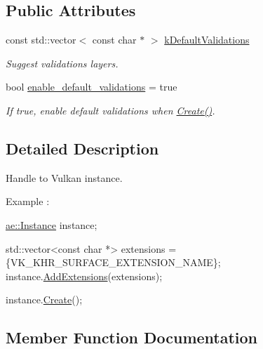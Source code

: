 \subsection*{Public Attributes}
\begin{DoxyCompactItemize}
\item 
const std\+::vector$<$ const char $\ast$ $>$ \hyperlink{classae_1_1_instance_a51fa0c0f46de73754c52841fc458d4ac}{k\+Default\+Validations}
\begin{DoxyCompactList}\small\item\em Suggest validations layers. \end{DoxyCompactList}\item 
\hypertarget{classae_1_1_instance_a5dabba3cfc37e4f41a5c8a0b710f2adf}{}\label{classae_1_1_instance_a5dabba3cfc37e4f41a5c8a0b710f2adf} 
bool \hyperlink{classae_1_1_instance_a5dabba3cfc37e4f41a5c8a0b710f2adf}{enable\+\_\+default\+\_\+validations} = true
\begin{DoxyCompactList}\small\item\em If true, enable default validations when \hyperlink{classae_1_1_instance_a9de8fa013e11a71aa6e09f142aa1a927}{Create()}. \end{DoxyCompactList}\end{DoxyCompactItemize}


\subsection{Detailed Description}
Handle to Vulkan instance. 

Example \+:


\begin{DoxyCode}
\hyperlink{classae_1_1_instance}{ae::Instance} instance;

std::vector<const char *> extensions = \{VK\_KHR\_SURFACE\_EXTENSION\_NAME\};
instance.\hyperlink{classae_1_1_instance_a880ed1eaf9b821ac616865821a5f15ef}{AddExtensions}(extensions);

instance.\hyperlink{classae_1_1_instance_a9de8fa013e11a71aa6e09f142aa1a927}{Create}();
\end{DoxyCode}
 

\subsection{Member Function Documentation}
\hypertarget{classae_1_1_instance_ae6ab8f05e13a1efeb8bcc4a6972b9072}{}\label{classae_1_1_instance_ae6ab8f05e13a1efeb8bcc4a6972b9072} 

